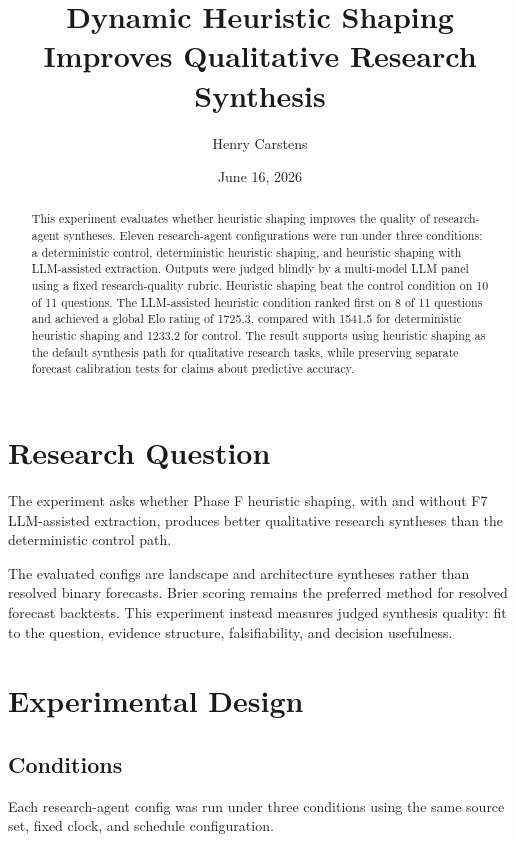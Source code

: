 \documentclass[11pt]{article}
\title{Dynamic Heuristic Shaping Improves Qualitative Research Synthesis}
\author{Henry Carstens}
\date{June 16, 2026}
\begin{document}
\maketitle

\begin{abstract}
This experiment evaluates whether heuristic shaping improves the quality of
research-agent syntheses. Eleven research-agent configurations were run under
three conditions: a deterministic control, deterministic heuristic shaping, and
heuristic shaping with LLM-assisted extraction. Outputs were judged blindly by a
multi-model LLM panel using a fixed research-quality rubric. Heuristic shaping
beat the control condition on 10 of 11 questions. The LLM-assisted heuristic
condition ranked first on 8 of 11 questions and achieved a global Elo rating of
1725.3, compared with 1541.5 for deterministic heuristic shaping and 1233.2 for
control. The result supports using heuristic shaping as the default synthesis
path for qualitative research tasks, while preserving separate forecast
calibration tests for claims about predictive accuracy.
\end{abstract}

\section{Research Question}

The experiment asks whether Phase F heuristic shaping, with and without F7
LLM-assisted extraction, produces better qualitative research syntheses than the
deterministic control path.

The evaluated configs are landscape and architecture syntheses rather than
resolved binary forecasts. Brier scoring remains the preferred method for
resolved forecast backtests. This experiment instead measures judged synthesis
quality: fit to the question, evidence structure, falsifiability, and decision
usefulness.

\section{Experimental Design}

\subsection{Conditions}

Each research-agent config was run under three conditions using the same source
set, fixed clock, and schedule configuration.
\end{document}
